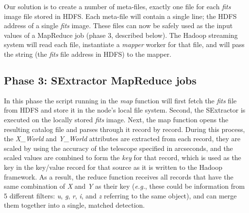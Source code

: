 \documentclass[11pt,twoside]{article}
\begin{document}
Our solution is to create a number of meta-files, exactly one file for each \textit{fits} image file stored in HDFS. Each meta-file will contain a single line; the HDFS address of a single \textit{fits} image. 
These files can now be safely used as the input values of a MapReduce job (phase 3, described below). The Hadoop streaming system will read each file, instantiate a \textit{mapper} worker for that file, and will pass the string (the \textit{fits} file address in HDFS) to the mapper. 

\subsection{Phase 3: SExtractor MapReduce jobs}
In this phase the script running in the \textit{map} function will first fetch the \textit{fits} file from HDFS and store it in the node's local file system. Second, the SExtractor is executed on the locally stored \textit{fits} image. Next, the map function opens the resulting catalog file and parses through it record by record. During this process, the \textit{X\_World} and \textit{Y\_World} attributes are extracted from each record, they are scaled by using the accuracy of the telescope specified in arcseconds, and the scaled values are combined to form the \textit{key} for that record, which is used as the key in the key/value record for that source as it is written to the Hadoop framework. As a result, the reduce function 
receives all  records that have the same combination of \textit{X} and \textit{Y} as their key (\textit{e.g.}, these could be information from 5 different filters: \textit{u}, \textit{g}, \textit{r}, \textit{i}, and \textit{z} referring to the same object), and can merge them together into a single, matched detection.
\end{document}
